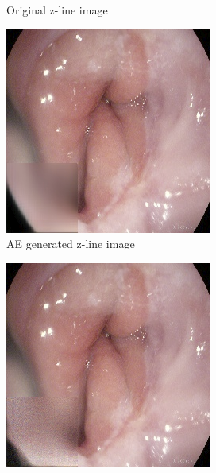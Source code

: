 \begin{figure}[h]
\begin{subfigure}[t]{\myfigsizethree}
            \caption{Original z-line image}    
            \label{fig:z_ORIG_SQUARE1}
        \end{subfigure}
        \qquad
        \begin{subfigure}[t]{\myfigsizethree}   
            \centering 
            \includegraphics[width=\textwidth]{experiments/figures/greensquare/zAE.png}
            \caption{AE generated z-line image}    
            \label{fig:z_AE_SQUARE1}
        \end{subfigure}
        \qquad%
        \begin{subfigure}[t]{\myfigsizethree}   
            \centering 
            \includegraphics[width=\textwidth]{experiments/figures/greensquare/zGAN.png}

\end{subfigure}
\end{figure}
